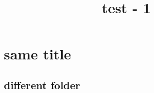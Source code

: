 \documentclass[11pt,reqno]{amsart}
\theoremstyle{definition}
\theoremstyle{remark}
\numberwithin{equation}{section}
\renewcommand{\(}{\left(}
\renewcommand{\)}{\right)}
\begin{document}
\title[]
{test - 1}

\maketitle

\section{same title}

\subsection{different folder}
\end{document}
